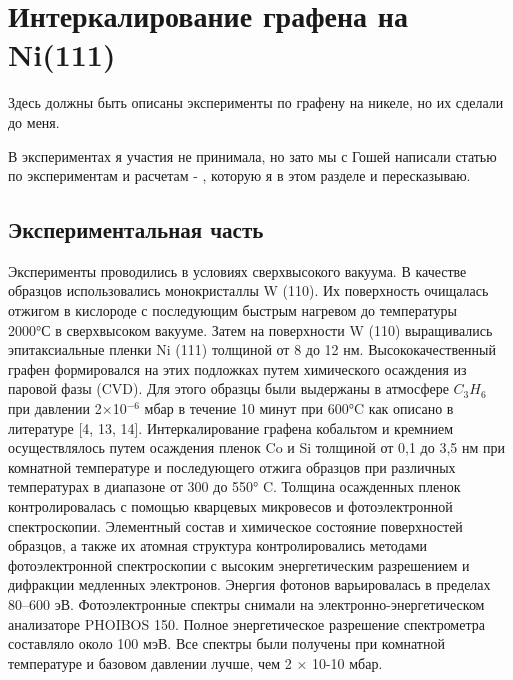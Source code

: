 
\chapter{Интеркалирование графена на Ni(111)}\label{ch:ch1}
Здесь должны быть описаны эксперименты по графену на никеле, но их сделали до меня.

В экспериментах я участия не принимала, но зато мы с Гошей написали статью по экспериментам и расчетам - \cite{grebenyuk2019840}, которую я в этом разделе и пересказываю.
\section{Экспериментальная часть}\label{sec:ch1/sec1}


Эксперименты проводились в условиях сверхвысокого вакуума. В качестве образцов использовались монокристаллы W (110). Их поверхность очищалась отжигом в кислороде с последующим быстрым нагревом до температуры ~ 2000°С в сверхвысоком вакууме. Затем на поверхности W (110)  выращивались эпитаксиальные пленки Ni (111) толщиной от 8 до 12 нм. Высококачественный графен формировался на этих подложках путем химического осаждения из паровой фазы (CVD). Для этого образцы были выдержаны в атмосфере $C_3H_6$ при давлении 2×10$^{-6}$ мбар в течение 10 минут при 600°C как описано в литературе [4, 13, 14]. Интеркалирование графена кобальтом и кремнием осуществлялось путем осаждения пленок Co и Si толщиной от 0,1 до 3,5 нм при комнатной температуре и последующего отжига образцов при различных температурах в диапазоне от 300 до 550° C. Толщина осажденных пленок контролировалась с помощью кварцевых микровесов и фотоэлектронной спектроскопии. 
Элементный состав и химическое состояние поверхностей образцов, а также их атомная структура контролировались методами фотоэлектронной спектроскопии с высоким энергетическим разрешением и дифракции медленных электронов. Энергия фотонов варьировалась в пределах 80–600 эВ. Фотоэлектронные спектры снимали на электронно-энергетическом анализаторе PHOIBOS 150. Полное энергетическое разрешение спектрометра составляло около 100 мэВ. Все спектры были получены при комнатной температуре и базовом давлении лучше, чем 2 × 10-10 мбар. 

